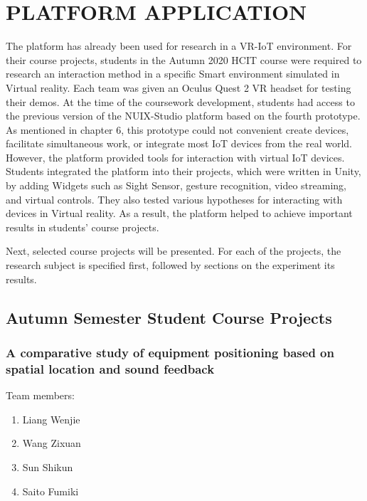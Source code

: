 
\chapter{\MakeUppercase{Platform application}}

The platform has already been used for research in a VR-IoT environment.
For their course projects, students in the Autumn 2020 HCIT course were required to research an interaction method in a specific Smart environment simulated in Virtual reality. Each team was given an Oculus Quest 2 VR headset for testing their demos. At the time of the coursework development, students had access to the previous version of the NUIX-Studio platform based on the fourth prototype. As mentioned in chapter 6, this prototype could not convenient create devices, facilitate simultaneous work, or integrate most IoT devices from the real world. However, the platform provided tools for interaction with virtual IoT devices. Students integrated the platform into their projects, which were written in Unity, by adding Widgets such as Sight Sensor, gesture recognition, video streaming, and virtual controls. They also tested various hypotheses for interacting with devices in Virtual reality. As a result, the platform helped to achieve important results in students' course projects. 

Next, selected course projects will be presented. For each of the projects, the research subject is specified first, followed by sections on the experiment its results.

\section{Autumn Semester Student Course Projects}

\subsection{A comparative study of equipment positioning based on spatial location and sound feedback}

Team members:
\begin{enumerate}
    \item Liang Wenjie
    \item Wang Zixuan
    \item Sun Shikun
    \item Saito Fumiki
\end{enumerate}

